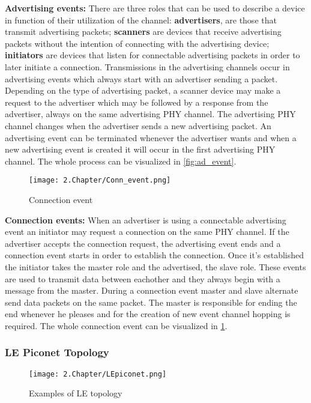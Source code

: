 \tab \textbf{Advertising events:} There are three roles that can be used to describe a device in function of their utilization of the channel: \textbf{advertisers}, are those that transmit advertising packets; \textbf{scanners} are devices that receive advertising packets without the intention of connecting with the advertising device; \textbf{initiators} are devices that listen for connectable advertising packets in order to later initiate a connection.
Transmissions in the advertising channels occur in advertising events which always start with an advertiser sending a packet. Depending on the type of advertising packet, a scanner device may make a request to the advertiser which may be followed by a response from the advertiser, always on the same advertising \ac{PHY} channel. The advertising \ac{PHY} channel changes when the advertiser sends a new advertising packet. An advertising event can be terminated whenever the advertiser wants and when a new advertising event is created it will  occur in the first advertising \ac{PHY} channel. The whole process can be visualized in \ref{fig:ad_event}.

\begin{figure}[H]
	\centering
		\texttt{[image: 2.Chapter/Conn\_event.png]}
	\caption[Connection Event]{Connection event}
	\label{fig:conn_event}
\end{figure}

\tab \textbf{Connection events:} When an advertiser is using a connectable advertising event an initiator may request a connection on the same \ac{PHY} channel. If the advertiser accepts the connection request, the advertising event ends and a connection event starts in order to establish the connection. Once it's established the initiator takes the master role and the advertised, the slave role. These events are used to transmit data between eachother and they always begin with a message from the master. During a connection event master and slave alternate send data packets on the same packet. The master is responsible for ending the end whenever he pleases and for the creation of new event channel hopping is required. The whole connection event can be visualized in \ref{fig:conn_event}. 

\subsubsection{\ac{LE} Piconet Topology}
\label{subsec:piconet}

\begin{figure}[H]
	\centering
		\texttt{[image: 2.Chapter/LEpiconet.png]}
	\caption[LE Topology]{Examples of LE topology}
	\label{fig:LEpiconet}
\end{figure}

